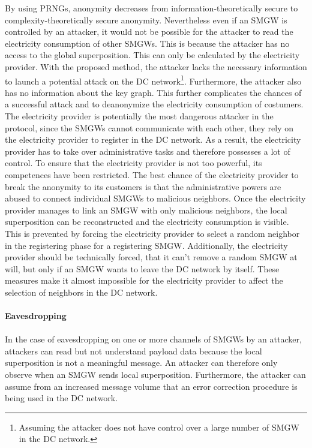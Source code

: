By using \gls{PRNG}s, anonymity decreases from information-theoretically secure to complexity-theoretically secure anonymity. Nevertheless even if an \gls{SMGW} is controlled by an attacker, it would not be possible for the attacker to read the electricity consumption of other \gls{SMGW}s. This is because the attacker has no access to the global superposition. This can only be calculated by the electricity provider. With the proposed method, the attacker lacks the necessary information to launch a potential attack on the DC network\footnote[6]{Assuming the attacker does not have control over a large number of \gls{SMGW} in the DC network.}. Furthermore, the attacker also has no information about the key graph. This further complicates the chances of a successful attack and to deanonymize the electricity consumption of costumers. The electricity provider is potentially the most dangerous attacker in the protocol, since the \gls{SMGW}s cannot communicate with each other, they rely on the electricity provider to register in the DC network. As a result, the electricity provider has to take over administrative tasks and therefore possesses a lot of control. To ensure that the electricity provider is not too powerful, its competences have been restricted. The best chance of the electricity provider to break the anonymity to its customers is that the administrative powers are abused to connect individual \gls{SMGW}s to malicious neighbors. Once the electricity provider manages to link an \gls{SMGW} with only malicious neighbors, the local superposition can be reconstructed and the electricity consumption is visible. This is prevented by forcing the electricity provider to select a random neighbor in the registering phase for a registering \gls{SMGW}. Additionally, the electricity provider should be technically forced, that it can't remove a random \gls{SMGW} at will, but only if an \gls{SMGW} wants to leave the DC network by itself. These measures make it almost impossible for the electricity provider to affect the selection of neighbors in the DC network.
\\
\\
\textbf{Eavesdropping}
\\
\\
In the case of eavesdropping on one or more channels of \gls{SMGW}s by an attacker, attackers can read but not understand payload data because the local superposition is not a meaningful message. An attacker can therefore only observe when an \gls{SMGW} sends local superposition. Furthermore, the attacker can assume from an increased message volume that an error correction procedure is being used in the DC network. 
